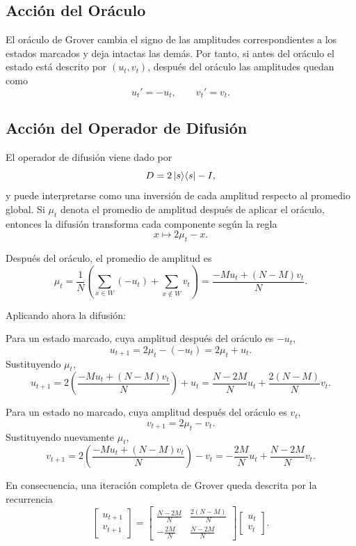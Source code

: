 \subsection*{Acción del Oráculo}

El oráculo de Grover cambia el signo de las amplitudes correspondientes a los estados
marcados y deja intactas las demás. Por tanto, si antes del oráculo el estado está descrito por
\((u_t,v_t)\), después del oráculo las amplitudes quedan como
\[
u_t'=-u_t,
\qquad
v_t'=v_t.
\]

\subsection*{Acción del Operador de Difusión}

El operador de difusión viene dado por
\[
D = 2\ket{s}\!\bra{s} - I,
\]
y puede interpretarse como una inversión de cada amplitud respecto al promedio global.
Si \(\mu_t\) denota el promedio de amplitud después de aplicar el oráculo, entonces la difusión
transforma cada componente según la regla
\[
x \mapsto 2\mu_t - x.
\]

Después del oráculo, el promedio de amplitud es
\[
\mu_t
=
\frac{1}{N}
\left(
\sum_{x\in W}(-u_t)+\sum_{x\notin W}v_t
\right)
=
\frac{-Mu_t+(N-M)v_t}{N}.
\]

Aplicando ahora la difusión:

Para un estado marcado, cuya amplitud después del oráculo es \(-u_t\),
\[
u_{t+1}=2\mu_t-(-u_t)=2\mu_t+u_t.
\]
Sustituyendo \(\mu_t\),
\[
u_{t+1}
=
2\left(\frac{-Mu_t+(N-M)v_t}{N}\right)+u_t
=
\frac{N-2M}{N}u_t+\frac{2(N-M)}{N}v_t.
\]

Para un estado no marcado, cuya amplitud después del oráculo es \(v_t\),
\[
v_{t+1}=2\mu_t-v_t.
\]
Sustituyendo nuevamente \(\mu_t\),
\[
v_{t+1}
=
2\left(\frac{-Mu_t+(N-M)v_t}{N}\right)-v_t
=
-\frac{2M}{N}u_t+\frac{N-2M}{N}v_t.
\]

En consecuencia, una iteración completa de Grover queda descrita por la recurrencia
\[
\begin{bmatrix}
u_{t+1}\\
v_{t+1}
\end{bmatrix}
=
\begin{bmatrix}
\frac{N-2M}{N} & \frac{2(N-M)}{N}\\[6pt]
-\frac{2M}{N} & \frac{N-2M}{N}
\end{bmatrix}
\begin{bmatrix}
u_t\\
v_t
\end{bmatrix}.
\]

